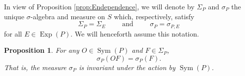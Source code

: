 \documentclass[11pt]{article}
\newtheorem{proposition}[theorem]{Proposition}
\theoremstyle{remark}
\newcommand\Sym{\operatorname{Sym}}
\newcommand\Exp{\operatorname{Exp}}
\begin{document}
\noindent In view of Proposition \ref{prop:Endependence}, we will denote by $\Sigma_P$ and $\sigma_P$ the unique $\sigma$-algebra and measure on $S$ which, respectively, satisfy
\begin{equation*}
    \Sigma_P=\Sigma_E\hspace{1cm}\mbox{and}\hspace{1cm}\sigma_P=\sigma_{P,E}
\end{equation*}
for all $E\in\Exp(P)$. We will henceforth assume this notation. 



\begin{proposition}\label{prop:SymInvariance}
For any $O\in\Sym(P)$ and $F\in\Sigma_P$,
\begin{equation*}
\sigma_P(O F)=\sigma_P(F).
\end{equation*} 
That is, the measure $\sigma_P$ is invariant under the action by $\Sym(P)$. 
\end{proposition}
\end{document}
